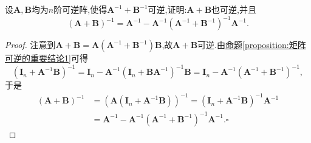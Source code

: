 \documentclass[../../main.tex]{subfiles}%
\begin{document}
\begin{example}\label{example:凑因子例2}
设\(\boldsymbol{A},\boldsymbol{B}\)均为\(n\)阶可逆阵,使得\(\boldsymbol{A}^{-1}+\boldsymbol{B}^{-1}\)可逆,证明:\(\boldsymbol{A}+\boldsymbol{B}\)也可逆,并且
\[
(\boldsymbol{A}+\boldsymbol{B})^{-1}=\boldsymbol{A}^{-1}-\boldsymbol{A}^{-1}(\boldsymbol{A}^{-1}+\boldsymbol{B}^{-1})^{-1}\boldsymbol{A}^{-1}.
\]
\end{example}
\begin{proof}

注意到\(\boldsymbol{A}+\boldsymbol{B}=\boldsymbol{A}(\boldsymbol{A}^{-1}+\boldsymbol{B}^{-1})\boldsymbol{B}\),故\(\boldsymbol{A}+\boldsymbol{B}\)可逆.由\hyperref[proposition:矩阵可逆的重要结论1]{命题\ref{proposition:矩阵可逆的重要结论1}}可得
\[
(\boldsymbol{I}_{n}+\boldsymbol{A}^{-1}\boldsymbol{B})^{-1}=\boldsymbol{I}_{n}-\boldsymbol{A}^{-1}(\boldsymbol{I}_{n}+\boldsymbol{B}\boldsymbol{A}^{-1})^{-1}\boldsymbol{B}=\boldsymbol{I}_{n}-\boldsymbol{A}^{-1}(\boldsymbol{A}^{-1}+\boldsymbol{B}^{-1})^{-1},
\]
于是
\begin{align*}
(\boldsymbol{A}+\boldsymbol{B})^{-1}&=(\boldsymbol{A}(\boldsymbol{I}_{n}+\boldsymbol{A}^{-1}\boldsymbol{B}))^{-1}=(\boldsymbol{I}_{n}+\boldsymbol{A}^{-1}\boldsymbol{B})^{-1}\boldsymbol{A}^{-1}\\
&=\boldsymbol{A}^{-1}-\boldsymbol{A}^{-1}(\boldsymbol{A}^{-1}+\boldsymbol{B}^{-1})^{-1}\boldsymbol{A}^{-1}.\square
\end{align*}

\end{proof}
\end{document}
